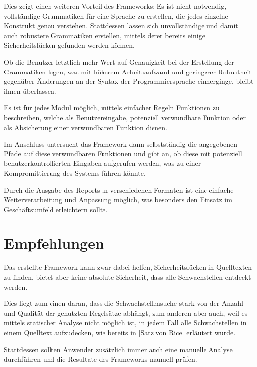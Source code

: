         Dies zeigt einen weiteren Vorteil des Frameworks: Es ist nicht notwendig,
        vollständige Grammatiken für eine Sprache zu erstellen,
        die jedes einzelne Konstrukt genau verstehen.
        Stattdessen lassen sich unvollständige und
        damit auch robustere Grammatiken erstellen,
        mittels derer bereits einige Sicherheitslücken gefunden werden können.

        Ob die Benutzer letztlich mehr Wert auf Genauigkeit bei der Erstellung der Grammatiken legen,
        was mit höherem Arbeitsaufwand und
        geringerer Robustheit gegenüber Änderungen an der Syntax der Programmiersprache einherginge,
        bleibt ihnen überlassen.

        Es ist für jedes Modul möglich,
        mittels einfacher Regeln Funktionen zu beschreiben,
        welche als Benutzereingabe,
        potenziell verwundbare Funktion oder
        als Absicherung einer verwundbaren Funktion dienen.

        Im Anschluss untersucht das Framework dann selbstständig die angegebenen Pfade auf diese verwundbaren Funktionen und
        gibt an,
        ob diese mit potenziell benutzerkontrollierten Eingaben aufgerufen werden,
        was zu einer Kompromittierung des Systems führen könnte.

        Durch die Ausgabe des Reports in verschiedenen Formaten ist eine einfache Weiterverarbeitung und
        Anpassung möglich,
        was besonders den Einsatz im Geschäftsumfeld erleichtern sollte.

    \section{Empfehlungen}
        Das erstellte Framework kann zwar dabei helfen,
        Sicherheitslücken in Quelltexten zu finden,
        bietet aber keine absolute Sicherheit,
        dass alle Schwachstellen entdeckt werden.

        Dies liegt zum einen daran,
        dass die Schwachstellensuche stark von der Anzahl und
        Qualität der genutzten Regelsätze abhängt,
        zum anderen aber auch,
        weil es mittels statischer Analyse nicht möglich ist,
        in jedem Fall alle Schwachstellen in einem Quelltext aufzudecken,
        wie bereits in
        \vref{Satz von Rice} erläutert wurde.

        Stattdessen sollten Anwender zusätzlich immer auch eine manuelle Analyse durchführen und
        die Resultate des Frameworks manuell prüfen.

